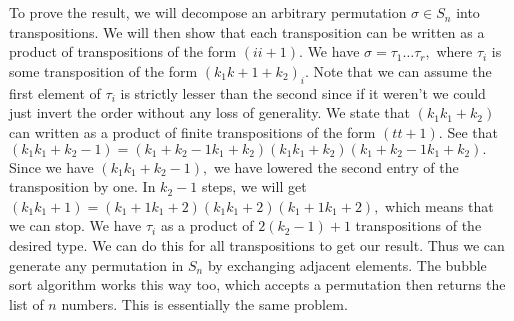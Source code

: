 \documentclass{article}
\title{} %
\author{Gandhar Kulkarni (mmat2304)} %
\date{} %
\begin{document}
\maketitle %


\section{} %
To prove the result, we will decompose an arbitrary permutation $\sigma \in S_n$ into transpositions. We will then show that each transposition can be 
written as a product of transpositions of the form $(i i+1).$ We have $\sigma=\tau_1\dots\tau_r,$ where $\tau_i$ is some transposition of the form $(k_1 
k+1+k_2)_i.$ Note that we can assume the first element of $\tau_i$ is strictly lesser than the second since if it weren't we could just invert the order 
without any loss of generality. We state that $(k_1 k_1+k_2)$ can written as a product of finite transpositions of the form $(t t+1).$ See that $(k_1 
k_1+k_2-1)=(k_1+k_2-1 k_1+k_2)(k_1 k_1+k_2)(k_1+k_2-1 k_1+k_2).$ Since we have $(k_1 k_1+k_2-1),$ we have lowered the second entry of the transposition by 
one. In $k_2-1$ steps, we will get $(k_1 k_1+1)=(k_1+1 k_1+2)(k_1 k_1+2)(k_1+1 k_1+2),$ which means that we can stop. We have $\tau_i$ as a product of 
$2(k_2-1)+1$ transpositions of the desired type. We can do this for all transpositions to get our result. Thus we can generate any permutation in $S_n$ by 
exchanging adjacent elements. 
The bubble sort algorithm works this way too, which accepts a permutation then returns the list of $n$ numbers. This is essentially the same problem.
\section{} %
\section{} %
\section{} %
\section{} %
\section{} %
\section{} %
\section{} %
\section{} %
\section{} %
\end{document}
